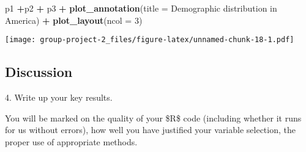 \documentclass[
]{article}
\newenvironment{Shaded}{\begin{snugshade}}{\end{snugshade}}
\newcommand{\AttributeTok}[1]{\textcolor[rgb]{0.13,0.29,0.53}{#1}}
\newcommand{\DecValTok}[1]{\textcolor[rgb]{0.00,0.00,0.81}{#1}}
\newcommand{\FunctionTok}[1]{\textcolor[rgb]{0.13,0.29,0.53}{\textbf{#1}}}
\newcommand{\NormalTok}[1]{#1}
\newcommand{\SpecialCharTok}[1]{\textcolor[rgb]{0.81,0.36,0.00}{\textbf{#1}}}
\newcommand{\StringTok}[1]{\textcolor[rgb]{0.31,0.60,0.02}{#1}}
\begin{document}
\begin{Shaded}
\begin{Highlighting}[]
\NormalTok{p1 }\SpecialCharTok{+}\NormalTok{p2 }\SpecialCharTok{+}\NormalTok{ p3 }\SpecialCharTok{+}
  \FunctionTok{plot\_annotation}\NormalTok{(}\AttributeTok{title =} \StringTok{\textquotesingle{}Demographic distribution in America\textquotesingle{}}\NormalTok{) }\SpecialCharTok{+}
  \FunctionTok{plot\_layout}\NormalTok{(}\AttributeTok{ncol =} \DecValTok{3}\NormalTok{)}
\end{Highlighting}
\end{Shaded}

\texttt{[image: group-project-2\_files/figure-latex/unnamed-chunk-18-1.pdf]}

\hypertarget{discussion}{%
\subsection{Discussion}\label{discussion}}

4. Write up your key results.

You will be marked on the quality of your \$R\$ code (including whether
it runs for us without errors), how well you have justified your
variable selection, the proper use of appropriate methods.
\end{document}
